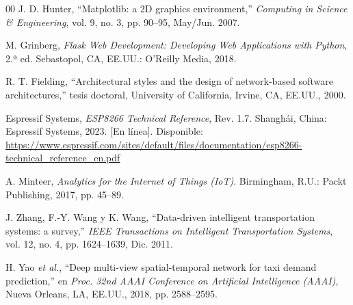 \documentclass[conference]{IEEEtran}
\begin{document}
\begin{thebibliography}{00}
J. D. Hunter,
``Matplotlib: a 2D graphics environment,''
\textit{Computing in Science \& Engineering},
vol. 9, no. 3, pp. 90--95, May/Jun. 2007.

M. Grinberg,
\textit{Flask Web Development: Developing Web Applications
with Python}, 2.ª ed.
Sebastopol, CA, EE.UU.: O'Reilly Media, 2018.

R. T. Fielding,
``Architectural styles and the design of network-based
software architectures,''
tesis doctoral, University of California, Irvine, CA,
EE.UU., 2000.

Espressif Systems,
\textit{ESP8266 Technical Reference}, Rev. 1.7.
Shanghái, China: Espressif Systems, 2023.
[En línea]. Disponible:
\url{https://www.espressif.com/sites/default/files/documentation/esp8266-technical_reference_en.pdf}

A. Minteer,
\textit{Analytics for the Internet of Things (IoT)}.
Birmingham, R.U.: Packt Publishing, 2017, pp. 45--89.

J. Zhang, F.-Y. Wang y K. Wang,
``Data-driven intelligent transportation systems:
a survey,''
\textit{IEEE Transactions on Intelligent Transportation
Systems},
vol. 12, no. 4, pp. 1624--1639, Dic. 2011.

H. Yao \textit{et al.},
``Deep multi-view spatial-temporal network for taxi demand
prediction,''
en \textit{Proc. 32nd AAAI Conference on Artificial
Intelligence (AAAI)},
Nueva Orleans, LA, EE.UU., 2018, pp. 2588--2595.

\end{thebibliography}
\end{document}
